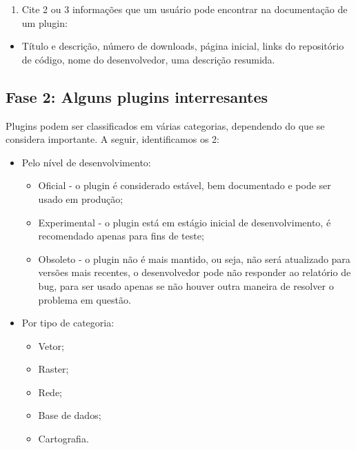 \documentclass[
]{book}
\providecommand{\tightlist}{%
  \setlength{\itemsep}{0pt}\setlength{\parskip}{0pt}}
\begin{document}
\begin{enumerate}
\def\labelenumi{\arabic{enumi}.}
\setcounter{enumi}{2}
\tightlist
\item
  Cite 2 ou 3 informações que um usuário pode encontrar na documentação de um plugin:
\end{enumerate}

\begin{itemize}
\tightlist
\item
  Título e descrição, número de downloads, página inicial, links do repositório de código, nome do desenvolvedor, uma descrição resumida.
\end{itemize}

\hypertarget{fase-2-alguns-plugins-interresantes}{%
\subsection{Fase 2: Alguns plugins interresantes}\label{fase-2-alguns-plugins-interresantes}}

Plugins podem ser classificados em várias categorias, dependendo do que se considera importante. A seguir, identificamos os 2:

\begin{itemize}
\tightlist
\item
  Pelo nível de desenvolvimento:

  \begin{itemize}
  \tightlist
  \item
    Oficial - o plugin é considerado estável, bem documentado e pode ser usado em produção;
  \item
    Experimental - o plugin está em estágio inicial de desenvolvimento, é recomendado apenas para fins de teste;
  \item
    Obsoleto - o plugin não é mais mantido, ou seja, não será atualizado para versões mais recentes, o desenvolvedor pode não responder ao relatório de bug, para ser usado apenas se não houver outra maneira de resolver o problema em questão.
  \end{itemize}
\item
  Por tipo de categoria:

  \begin{itemize}
  \tightlist
  \item
    Vetor;
  \item
    Raster;
  \item
    Rede;
  \item
    Base de dados;
  \item
    Cartografia.
  \end{itemize}
\end{itemize}
\end{document}
